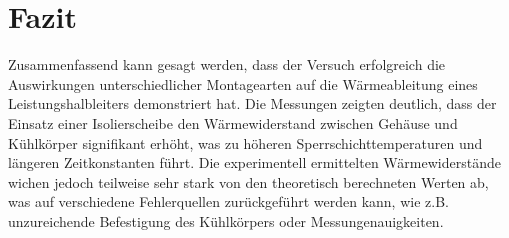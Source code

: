 \section{Fazit}
Zusammenfassend kann gesagt werden, dass der Versuch erfolgreich die Auswirkungen unterschiedlicher Montagearten auf die Wärmeableitung eines Leistungshalbleiters demonstriert hat. Die Messungen zeigten deutlich, dass der Einsatz einer Isolierscheibe den Wärmewiderstand zwischen Gehäuse und Kühlkörper signifikant erhöht, was zu höheren Sperrschichttemperaturen und längeren Zeitkonstanten führt. 
Die experimentell ermittelten Wärmewiderstände wichen jedoch teilweise sehr stark von den theoretisch berechneten Werten ab, was auf verschiedene Fehlerquellen zurückgeführt werden kann, wie z.B. unzureichende Befestigung des Kühlkörpers oder Messungenauigkeiten.